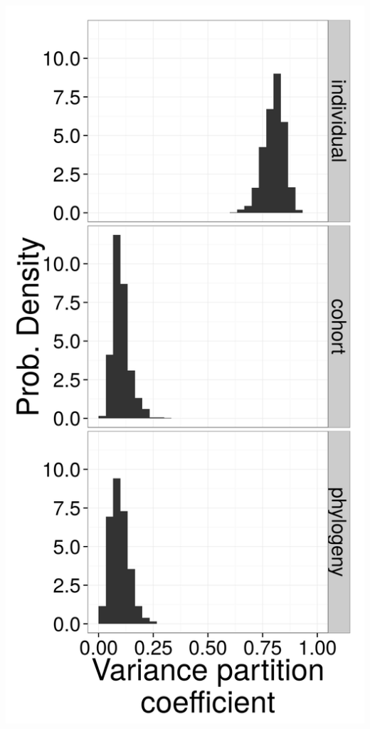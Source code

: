 \documentclass{beamer}
\begin{document}
\begin{frame}
\begin{columns}
\begin{column}{0.5\textwidth}
      \includegraphics[width=\textwidth,height=0.8\textheight,keepaspectratio=true]{figure/variance_est}
    \end{column}
  \end{columns}
\end{frame}
\end{document}
